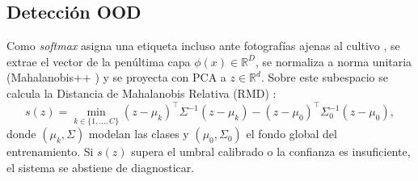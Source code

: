 \subsection{Detecci\'on OOD}
Como \textit{softmax} asigna una etiqueta incluso ante fotograf\'ias ajenas al cultivo \cite{lee2018}, se extrae el vector de la pen\'ultima capa $\phi(x)\in\mathbb{R}^{D}$, se normaliza a norma unitaria (Mahalanobis++ \cite{mahalanobispp2025}) y se proyecta con PCA a $z\in\mathbb{R}^{d}$. Sobre este subespacio se calcula la Distancia de Mahalanobis Relativa (RMD) \cite{ren2021}:
\begin{equation}
s(z) = \min_{k\in\{1,\dots,C\}} (z - \mu_k)^{\top}\Sigma^{-1}(z - \mu_k) - (z - \mu_0)^{\top}\Sigma_0^{-1}(z - \mu_0),
\label{eq:rmd_mt}
\end{equation}
donde $(\mu_k, \Sigma)$ modelan las clases y $(\mu_0, \Sigma_0)$ el fondo global del entrenamiento. Si $s(z)$ supera el umbral calibrado o la confianza es insuficiente, el sistema se abstiene de diagnosticar.
